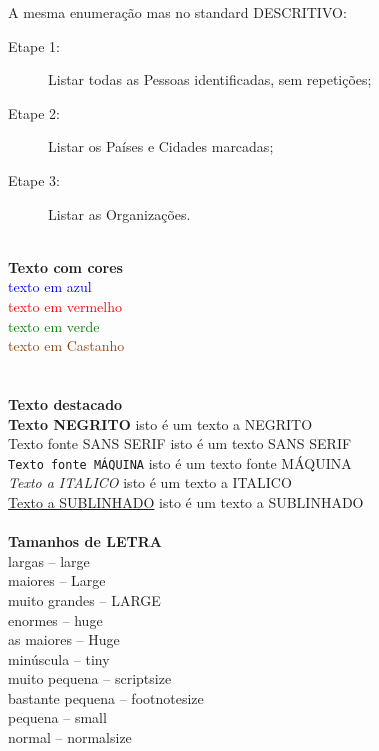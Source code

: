 \documentclass[11pt,a4paper]{report}%
\begin{document}
A mesma enumeração mas no standard DESCRITIVO:
\begin{description}
\item[Etape 1:] Listar todas as Pessoas identificadas, sem repetições;
\item[Etape 2:] Listar os Países e Cidades marcadas;
\item[Etape 3:] Listar as Organizações.\\\\
\end{description}


\textbf{Texto com cores}\\

\textcolor{blue}{texto em azul}\\
\textcolor{red}{texto em vermelho} \\
\textcolor{green}{texto em verde} \\
\textcolor{saddlebrown}{texto em Castanho} \\\\\\

\textbf{Texto destacado}\\

 \textbf{Texto NEGRITO} isto é um texto a NEGRITO \\%
 \textsf{Texto fonte SANS SERIF} isto é um texto SANS SERIF \\ %
 \texttt{Texto fonte MÁQUINA}  isto é um texto fonte MÁQUINA\\ %
 \textit{Texto a ITALICO} isto é um texto a ITALICO\\ %
 \underline{Texto a SUBLINHADO} isto é um texto a SUBLINHADO \\\\ %

\textbf{Tamanhos de LETRA}\\

\large{largas -- large}\\
\Large{maiores -- Large}\\
\LARGE{muito grandes -- LARGE}\\
\huge{enormes --  huge}\\
\Huge{as maiores -- Huge}\\
\tiny{minúscula  -- tiny}\\
\scriptsize{muito pequena -- scriptsize} \\
\footnotesize{bastante pequena  -- footnotesize}\\
\small{pequena -- small}\\
\normalsize{normal -- normalsize}\\\\
\end{document}
